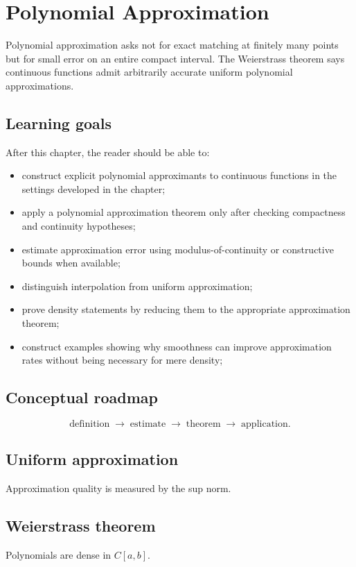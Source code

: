 \chapter{Polynomial Approximation}
\label{ch:ii21}

Polynomial approximation asks not for exact matching at finitely many points but for small error on an entire compact interval. The Weierstrass theorem says continuous functions admit arbitrarily accurate uniform polynomial approximations.

\section*{Learning goals}
After this chapter, the reader should be able to:
\begin{itemize}
\item construct explicit polynomial approximants to continuous functions in the settings developed in the chapter;
\item apply a polynomial approximation theorem only after checking compactness and continuity hypotheses;
\item estimate approximation error using modulus-of-continuity or constructive bounds when available;
\item distinguish interpolation from uniform approximation;
\item prove density statements by reducing them to the appropriate approximation theorem;
\item construct examples showing why smoothness can improve approximation rates without being necessary for mere density;
\end{itemize}
\section*{Conceptual roadmap}
\[
\boxed{\text{definition}\;\longrightarrow\;\text{estimate}\;\longrightarrow\;\text{theorem}\;\longrightarrow\;\text{application}.}
\]

\section{Uniform approximation}
Approximation quality is measured by the sup norm.

\section{Weierstrass theorem}
Polynomials are dense in $C[a,b]$.

